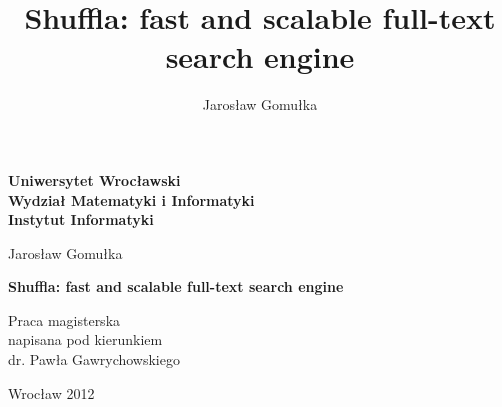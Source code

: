 \documentclass{llncs}
\newcommand{\<}{\langle}
\renewcommand{\>}{\rangle}
\begin{document}
\topmargin-20pt
\textwidth445pt

\begin{titlepage}
\large

\begin{center}

\textbf{\normalsize%
Uniwersytet Wrocławski\\
Wydział Matematyki i Informatyki\\
Instytut Informatyki}


\vspace{4cm}
Jarosław Gomułka

\vspace{0.5cm}
\textbf{%
Shuffla: fast and scalable full-text search engine}

\end{center}


\vspace{7cm}
\begin{flushright}
\begin{minipage}[c]{6cm}
  Praca magisterska\\
  napisana pod kierunkiem\\
  dr. Pawła Gawrychowskiego
\end{minipage}
\end{flushright}

\vfill

\begin{center}
 Wrocław 2012
\end{center}

\newpage

\end{titlepage}




\title{Shuffla: fast and scalable full-text search engine}
\author{Jarosław Gomułka}
\institute{}

\maketitle
\end{document}
